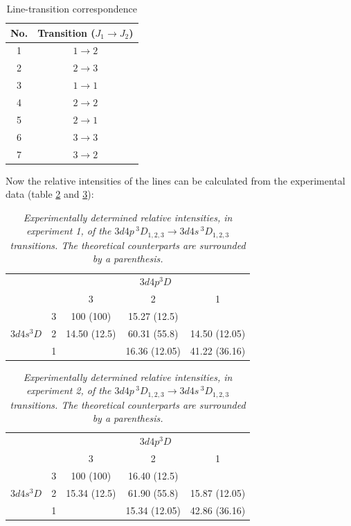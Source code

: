 \documentclass[a4paper]{article}
\begin{document}
\begin{table}
\centering
\begin{tabular}{c|c}
No. & Transition ($J_1 \to J_2$)\\
\hline
1 & $1 \to 2$ \\
2 & $2 \to 3$ \\
3 & $1 \to 1$ \\
4 & $2 \to 2$\\
5 & $2 \to 1$\\
6 & $3 \to 3$\\
7 & $3 \to 2$\\
\hline
\end{tabular}
\caption{Line-transition correspondence}
\label{tab:line-transition1}
\end{table}
Now the relative intensities of the lines can be calculated from the
experimental data (table \ref{tab:exp-intensity11} and \ref{tab:exp-intensity12}):
\begin{table}[htb!]
\centering
\begin{tabular}{cc|c|c|c|}
\cline{3-5}
& & \multicolumn{3}{c|}{$3d4p ^3D$}\\
\cline{3-5}
& & 3 & 2 & 1\\
\hline
\multicolumn{1}{|c|}{\multirow{3}{*}{$3d4s ^3D$}} & 3 & 100 (100) &
15.27 (12.5) & \\
\multicolumn{1}{|c|}{} & 2 & 14.50 (12.5) & 60.31 (55.8) & 14.50 (12.05) \\
\multicolumn{1}{|c|}{} & 1 & & 16.36 (12.05) & 41.22 (36.16) \\
\hline
\end{tabular}
\caption{\it Experimentally determined relative intensities, in experiment 1, of the
  $3d4p\,^3D_{1,2,3} \to 3d4s\,^3D_{1,2,3}$ transitions. The
  theoretical counterparts are surrounded by a parenthesis.}
\label{tab:exp-intensity11}
\end{table}

\begin{table}[htb!]
\centering
\begin{tabular}{cc|c|c|c|}
\cline{3-5}
& & \multicolumn{3}{c|}{$3d4p ^3D$}\\
\cline{3-5}
& & 3 & 2 & 1\\
\hline
\multicolumn{1}{|c|}{\multirow{3}{*}{$3d4s ^3D$}} & 3 & 100 (100) &
16.40 (12.5) & \\
\multicolumn{1}{|c|}{} & 2 & 15.34 (12.5) & 61.90 (55.8) & 15.87 (12.05) \\
\multicolumn{1}{|c|}{} & 1 & & 15.34 (12.05) & 42.86 (36.16) \\
\hline
\end{tabular}
\caption{\it Experimentally determined relative intensities, in experiment 2, of the
  $3d4p\,^3D_{1,2,3} \to 3d4s\,^3D_{1,2,3}$ transitions. The
  theoretical counterparts are surrounded by a parenthesis.}
\label{tab:exp-intensity12}
\end{table}
\end{document}
